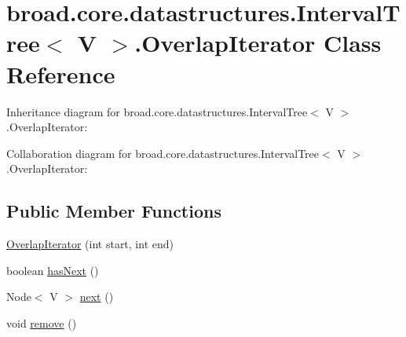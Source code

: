 \hypertarget{classbroad_1_1core_1_1datastructures_1_1_interval_tree_3_01_v_01_4_1_1_overlap_iterator}{\section{broad.\+core.\+datastructures.\+Interval\+Tree$<$ V $>$.Overlap\+Iterator Class Reference}
\label{classbroad_1_1core_1_1datastructures_1_1_interval_tree_3_01_v_01_4_1_1_overlap_iterator}
}


Inheritance diagram for broad.\+core.\+datastructures.\+Interval\+Tree$<$ V $>$.Overlap\+Iterator\+:


Collaboration diagram for broad.\+core.\+datastructures.\+Interval\+Tree$<$ V $>$.Overlap\+Iterator\+:
\subsection*{Public Member Functions}
\begin{DoxyCompactItemize}
\item 
\hyperlink{classbroad_1_1core_1_1datastructures_1_1_interval_tree_3_01_v_01_4_1_1_overlap_iterator_a6cefae17385b7219bede4255d0828763}{Overlap\+Iterator} (int start, int end)
\item 
boolean \hyperlink{classbroad_1_1core_1_1datastructures_1_1_interval_tree_3_01_v_01_4_1_1_overlap_iterator_a87dc383797ed3ccabbd15d2b0dedc27a}{has\+Next} ()
\item 
Node$<$ V $>$ \hyperlink{classbroad_1_1core_1_1datastructures_1_1_interval_tree_3_01_v_01_4_1_1_overlap_iterator_a5e58456b0ad7cc535b7bed7680eec2e3}{next} ()
\item 
void \hyperlink{classbroad_1_1core_1_1datastructures_1_1_interval_tree_3_01_v_01_4_1_1_overlap_iterator_a868c3e97848fb07149f370ec2def4765}{remove} ()
\end{DoxyCompactItemize}


